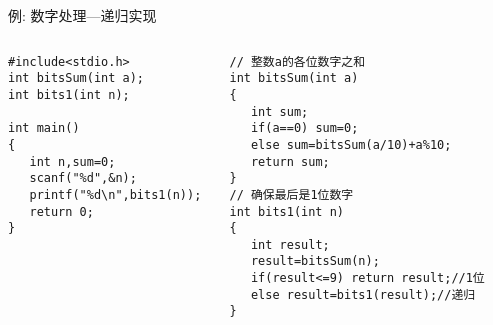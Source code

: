 \begin{frame}{例: 数字处理---递归实现}
\begin{columns}[T]
\begin{lstlisting}
#include<stdio.h>
int bitsSum(int a);
int bits1(int n);

int main()
{
   int n,sum=0;
   scanf("%d",&n);
   printf("%d\n",bits1(n)); 
   return 0;
} 
\end{lstlisting}
\begin{lstlisting}
// 整数a的各位数字之和
int bitsSum(int a)
{
   int sum;
   if(a==0) sum=0;  
   else sum=bitsSum(a/10)+a%10;
   return sum;
}
// 确保最后是1位数字
int bits1(int n)
{
   int result;
   result=bitsSum(n);
   if(result<=9) return result;//1位 
   else result=bits1(result);//递归 
}
\end{lstlisting}
\end{columns}
~\\
\end{frame}

